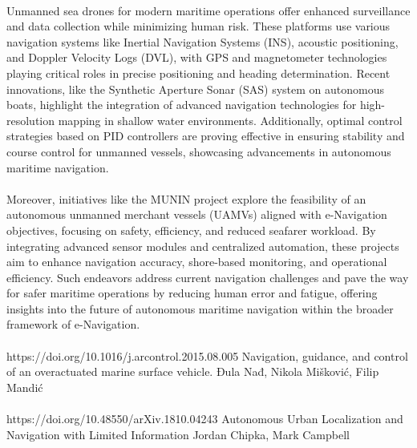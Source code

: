 \paragraph{} Unmanned sea drones for modern maritime operations offer enhanced surveillance and data collection while minimizing human 
            risk. These platforms use various navigation systems like Inertial Navigation Systems (INS), acoustic positioning, and 
            Doppler Velocity Logs (DVL), with GPS and magnetometer technologies playing critical roles in precise positioning and 
            heading determination. Recent innovations, like the Synthetic Aperture Sonar (SAS) system on autonomous boats, highlight 
            the integration of advanced navigation technologies for high-resolution mapping in shallow water environments. 
            Additionally, optimal control strategies based on PID controllers are proving effective in ensuring stability and course 
            control for unmanned vessels, showcasing advancements in autonomous maritime navigation.

\paragraph{} Moreover, initiatives like the MUNIN project explore the feasibility of an autonomous unmanned merchant vessels (UAMVs) 
            aligned with e-Navigation objectives, focusing on safety, efficiency, and reduced seafarer workload. By integrating 
            advanced sensor modules and centralized automation, these projects aim to enhance navigation accuracy, shore-based 
            monitoring, and operational efficiency. Such endeavors address current navigation challenges and pave the way for safer 
            maritime operations by reducing human error and fatigue, offering insights into the future of autonomous maritime 
            navigation within the broader framework of e-Navigation.

\paragraph{} https://doi.org/10.1016/j.arcontrol.2015.08.005  Navigation, guidance, and control of an overactuated marine surface vehicle. 
            Đula Nađ, Nikola Mišković, Filip Mandić

\paragraph{} https://doi.org/10.48550/arXiv.1810.04243 Autonomous Urban Localization and Navigation with Limited Information Jordan Chipka, Mark Campbell

